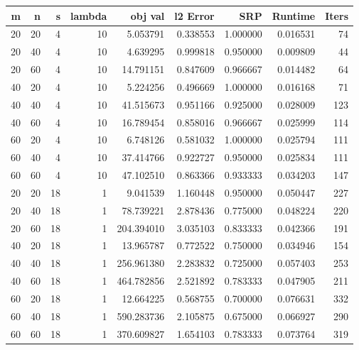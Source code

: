 \begin{tabular}{rrrrrrrrr}
\toprule
 m &  n &  s &  lambda &    obj val &  l2 Error &      SRP &  Runtime &  Iters \\
\midrule
20 & 20 &  4 &      10 &   5.053791 &  0.338553 & 1.000000 & 0.016531 &     74 \\
20 & 40 &  4 &      10 &   4.639295 &  0.999818 & 0.950000 & 0.009809 &     44 \\
20 & 60 &  4 &      10 &  14.791151 &  0.847609 & 0.966667 & 0.014482 &     64 \\
40 & 20 &  4 &      10 &   5.224256 &  0.496669 & 1.000000 & 0.016168 &     71 \\
40 & 40 &  4 &      10 &  41.515673 &  0.951166 & 0.925000 & 0.028009 &    123 \\
40 & 60 &  4 &      10 &  16.789454 &  0.858016 & 0.966667 & 0.025999 &    114 \\
60 & 20 &  4 &      10 &   6.748126 &  0.581032 & 1.000000 & 0.025794 &    111 \\
60 & 40 &  4 &      10 &  37.414766 &  0.922727 & 0.950000 & 0.025834 &    111 \\
60 & 60 &  4 &      10 &  47.102510 &  0.863366 & 0.933333 & 0.034203 &    147 \\
20 & 20 & 18 &       1 &   9.041539 &  1.160448 & 0.950000 & 0.050447 &    227 \\
20 & 40 & 18 &       1 &  78.739221 &  2.878436 & 0.775000 & 0.048224 &    220 \\
20 & 60 & 18 &       1 & 204.394010 &  3.035103 & 0.833333 & 0.042366 &    191 \\
40 & 20 & 18 &       1 &  13.965787 &  0.772522 & 0.750000 & 0.034946 &    154 \\
40 & 40 & 18 &       1 & 256.961380 &  2.283832 & 0.725000 & 0.057403 &    253 \\
40 & 60 & 18 &       1 & 464.782856 &  2.521892 & 0.783333 & 0.047905 &    211 \\
60 & 20 & 18 &       1 &  12.664225 &  0.568755 & 0.700000 & 0.076631 &    332 \\
60 & 40 & 18 &       1 & 590.283736 &  2.105875 & 0.675000 & 0.066927 &    290 \\
60 & 60 & 18 &       1 & 370.609827 &  1.654103 & 0.783333 & 0.073764 &    319 \\
\bottomrule
\end{tabular}
